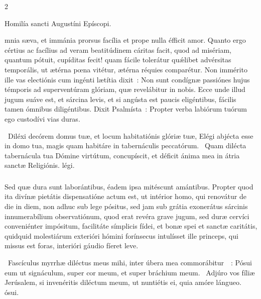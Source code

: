 \documentclass[9pt,twoside]{extarticle}
\begin{document}
\begin{multicols}{2}
{{\begin{center}Homilía sancti Augustíni Epíscopi.\\
\end{center}
mnia sæva, et immánia prorsus facília et prope nulla éfficit amor. Quanto ergo cértius ac facílius ad veram beatitúdinem cáritas facit, quod ad misériam, quantum pótuit, cupíditas fecit! quam fácile tolerátur quǽlibet advérsitas temporális, ut ætérna pœna vitétur, ætérna réquies comparétur. Non immérito ille vas electiónis cum ingénti lætítia dixit~: Non sunt condígnæ passiónes hujus témporis ad superventúram glóriam, quæ revelábitur in nobis. Ecce unde illud jugum suáve est, et sárcina levis, et si angústa est paucis eligéntibus, fácilis tamen ómnibus diligéntibus. Dixit Psalmísta~: Propter verba labiórum tuórum ego custodívi vias duras.

\begin{tightlist}{}
\item {}~Diléxi decórem domus tuæ, et locum habitatiónis glóriæ tuæ, \textred{*} Elégi abjécta esse in domo tua, magis quam habitáre in tabernáculis peccatórum. ~Quam dilécta tabernácula tua Dómine virtútum, concupíscit, et déficit ánima mea in átria sanctæ Religiónis. légi.
\end{tightlist}

\subsubsection*{\center {}}
Sed quæ dura sunt laborántibus, éadem ipsa mitéscunt amántibus. Propter quod ita divínæ pietátis dispensatióne actum est, ut intérior homo, qui renovátur de die in diem, non adhuc sub lege pósitus, sed jam sub grátia exonerátus sárcinis innumerabílium observatiónum, quod erat revéra grave jugum, sed duræ cervíci conveniénter impósitum, facilitáte símplicis fídei, et bonæ spei et sanctæ caritátis, quidquid molestiárum exterióri hómini forínsecus intulísset ille princeps, qui missus est foras, interióri gáudio fíeret leve.

\begin{tightlist}{}
\item {}~Fascículus myrrhæ diléctus meus mihi, inter úbera mea commorábitur~~: \textred{*} Pósui eum ut signáculum, super cor meum, et super bráchium meum. ~Adjúro vos fíliæ Jerúsalem, si invenéritis diléctum meum, ut nuntiétis ei, quia amóre lángueo. ósui.
\end{tightlist}

}}
\end{multicols}
\end{document}
